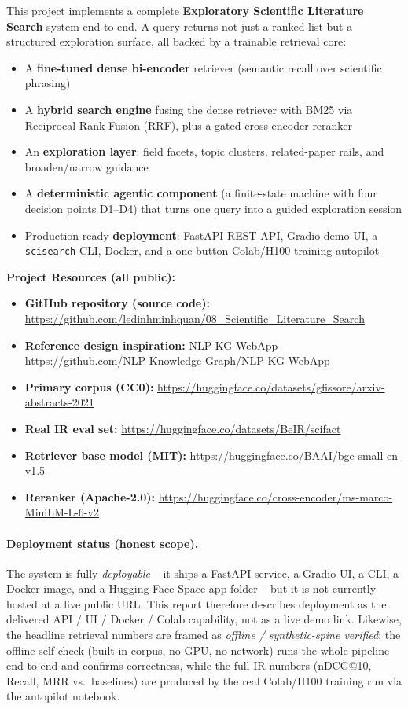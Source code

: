 \documentclass[12pt,a4paper]{article}
\begin{document}
This project implements a complete \textbf{Exploratory Scientific Literature Search} system end-to-end. A query returns not just a ranked list but a structured exploration surface, all backed by a trainable retrieval core:
\begin{itemize}
  \item A \textbf{fine-tuned dense bi-encoder} retriever (semantic recall over scientific phrasing)
  \item A \textbf{hybrid search engine} fusing the dense retriever with BM25 via Reciprocal Rank Fusion (RRF), plus a gated cross-encoder reranker
  \item An \textbf{exploration layer}: field facets, topic clusters, related-paper rails, and broaden/narrow guidance
  \item A \textbf{deterministic agentic component} (a finite-state machine with four decision points D1--D4) that turns one query into a guided exploration session
  \item Production-ready \textbf{deployment}: FastAPI REST API, Gradio demo UI, a \texttt{scisearch} CLI, Docker, and a one-button Colab/H100 training autopilot
\end{itemize}

\textbf{Project Resources (all public):}
\begin{itemize}\setlength\itemsep{0.15em}
  \item \textbf{GitHub repository (source code):} \url{https://github.com/ledinhminhquan/08_Scientific_Literature_Search}
  \item \textbf{Reference design inspiration:} NLP-KG-WebApp \url{https://github.com/NLP-Knowledge-Graph/NLP-KG-WebApp}
  \item \textbf{Primary corpus (CC0):} \url{https://huggingface.co/datasets/gfissore/arxiv-abstracts-2021}
  \item \textbf{Real IR eval set:} \url{https://huggingface.co/datasets/BeIR/scifact}
  \item \textbf{Retriever base model (MIT):} \url{https://huggingface.co/BAAI/bge-small-en-v1.5}
  \item \textbf{Reranker (Apache-2.0):} \url{https://huggingface.co/cross-encoder/ms-marco-MiniLM-L-6-v2}
\end{itemize}

\paragraph{Deployment status (honest scope).} The system is fully \emph{deployable} -- it ships a FastAPI service, a Gradio UI, a CLI, a Docker image, and a Hugging Face Space app folder -- but it is not currently hosted at a live public URL. This report therefore describes deployment as the delivered API / UI / Docker / Colab capability, not as a live demo link. Likewise, the headline retrieval numbers are framed as \emph{offline / synthetic-spine verified}: the offline self-check (built-in corpus, no GPU, no network) runs the whole pipeline end-to-end and confirms correctness, while the full IR numbers (nDCG@10, Recall, MRR vs.\ baselines) are produced by the real Colab/H100 training run via the autopilot notebook.
\end{document}
